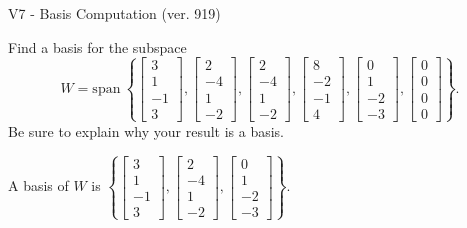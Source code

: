 \begin{exercise}
  \begin{exerciseTitle}V7 - Basis Computation (ver. 919)\end{exerciseTitle}
  \begin{exerciseStatement}
    Find a basis for the subspace 
\[W=\mathrm{span}\ \left\{\left[\begin{array}{r}
3 \\
1 \\
-1 \\
3
\end{array}\right] , \left[\begin{array}{r}
2 \\
-4 \\
1 \\
-2
\end{array}\right] , \left[\begin{array}{r}
2 \\
-4 \\
1 \\
-2
\end{array}\right] , \left[\begin{array}{r}
8 \\
-2 \\
-1 \\
4
\end{array}\right] , \left[\begin{array}{r}
0 \\
1 \\
-2 \\
-3
\end{array}\right] , \left[\begin{array}{r}
0 \\
0 \\
0 \\
0
\end{array}\right]\right\}.\]
 Be sure to explain why your result is a basis.


  \end{exerciseStatement}
  \begin{exerciseAnswer}
   A basis of \(W\) is  \(\left\{\left[\begin{array}{r}
3 \\
1 \\
-1 \\
3
\end{array}\right] , \left[\begin{array}{r}
2 \\
-4 \\
1 \\
-2
\end{array}\right] , \left[\begin{array}{r}
0 \\
1 \\
-2 \\
-3
\end{array}\right]\right\}\).
  


  \end{exerciseAnswer}
\end{exercise}